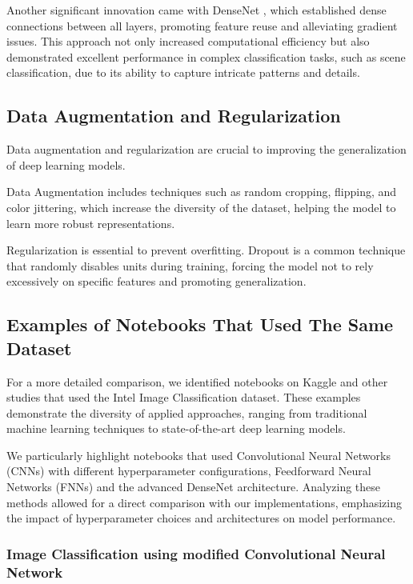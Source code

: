 Another significant innovation came with DenseNet \cite{densenet}, which established dense connections between all layers, promoting feature reuse and alleviating gradient issues. This approach not only increased computational efficiency but also demonstrated excellent performance in complex classification tasks, such as scene classification, due to its ability to capture intricate patterns and details.

\subsection{Data Augmentation and Regularization}

Data augmentation and regularization are crucial to improving the generalization of deep learning models.

Data Augmentation includes techniques such as random cropping, flipping, and color jittering, which increase the diversity of the dataset, helping the model to learn more robust representations.

Regularization is essential to prevent overfitting. Dropout is a common technique that randomly disables units during training, forcing the model not to rely excessively on specific features and promoting generalization.

\subsection{Examples of Notebooks That Used The Same Dataset}

For a more detailed comparison, we identified notebooks on Kaggle and other studies that used the Intel Image Classification dataset. These examples demonstrate the diversity of applied approaches, ranging from traditional machine learning techniques to state-of-the-art deep learning models.

We particularly highlight notebooks that used Convolutional Neural Networks (CNNs) with different hyperparameter configurations, Feedforward Neural Networks (FNNs) and the advanced DenseNet architecture. Analyzing these methods allowed for a direct comparison with our implementations, emphasizing the impact of hyperparameter choices and architectures on model performance.

\subsubsection{Image Classification using modified Convolutional Neural Network}

